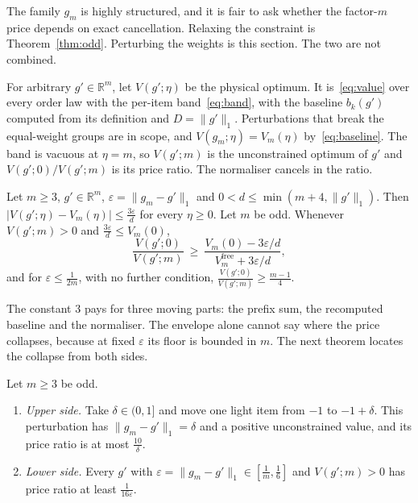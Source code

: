 The family $g_{m}$ is highly structured, and it is fair to ask whether the factor-$m$ price
depends on exact cancellation. Relaxing the constraint is Theorem~\ref{thm:odd}. Perturbing
the weights is this section. The two are not combined.

For arbitrary $g'\in\mathbb{R}^{m}$, let $V(g';\eta)$ be the physical optimum. It
is~\eqref{eq:value} over every order law with the per-item band~\eqref{eq:band}, with the
baseline $b_{k}(g')$ computed from its definition and $D=\|g'\|_{1}$. Perturbations that break
the equal-weight groups are in scope, and $V(g_{m};\eta)=V_{m}(\eta)$
by~\eqref{eq:baseline}. The band is vacuous at $\eta=m$, so $V(g';m)$ is the unconstrained
optimum of $g'$ and $V(g';0)/V(g';m)$ is its price ratio. The normaliser cancels in the
ratio.

\begin{theorem}[Envelope]
\label{thm:robust}
Let $m\ge3$, $g'\in\mathbb{R}^{m}$, $\varepsilon=\|g_{m}-g'\|_{1}$ and
$0<d\le\min(m+4,\|g'\|_{1})$. Then $|V(g';\eta)-V_{m}(\eta)|\le\frac{3\varepsilon}{d}$ for
every $\eta\ge0$. Let $m$ be odd. Whenever $V(g';m)>0$ and $\frac{3\varepsilon}{d}\le V_{m}(0)$,
\[
\frac{V(g';0)}{V(g';m)}\ \ge\ \frac{V_{m}(0)-3\varepsilon/d}{V^{\mathrm{free}}_{m}+3\varepsilon/d},
\]
and for $\varepsilon\le\frac{1}{2m}$, with no further condition,
$\frac{V(g';0)}{V(g';m)}\ge\frac{m-1}{4}$.
\end{theorem}


The constant $3$ pays for three moving parts: the prefix sum, the recomputed baseline and the
normaliser. The envelope alone cannot say where the price collapses, because at fixed
$\varepsilon$ its floor is bounded in $m$. The next theorem locates the collapse from both
sides.

\begin{theorem}
\label{thm:collapse}
Let $m\ge3$ be odd.
\begin{enumerate}
\item[(a)] \emph{Upper side.} Take $\delta\in(0,1]$ and move one light item from $-1$ to
$-1+\delta$. This perturbation has $\|g_{m}-g'\|_{1}=\delta$ and a positive unconstrained
value, and its price ratio is at most $\frac{10}{\delta}$.
\item[(b)] \emph{Lower side.} Every $g'$ with $\varepsilon=\|g_{m}-g'\|_{1}\in[\frac1m,\frac16]$
and $V(g';m)>0$ has price ratio at least $\frac{1}{16\varepsilon}$.
\end{enumerate}
\end{theorem}

